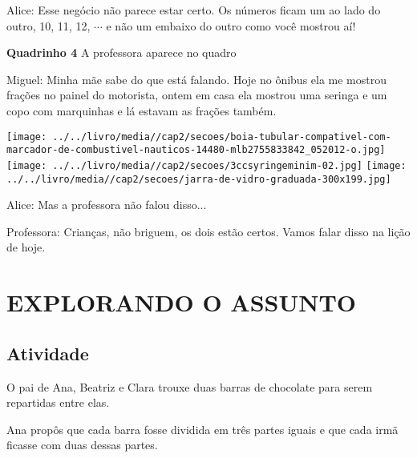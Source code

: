 \documentclass[a4,12pt]{book}
\begin{document}
\begin{imagem*}[breakable]{}{}
  Alice: Esse negócio não parece estar certo. Os números ficam um ao lado do outro, 10, 11, 12,   $\cdots$   e não um embaixo do outro como você mostrou aí!  
  
  {\bf Quadrinho 4}  
  A professora aparece no quadro  
  
  Miguel: Minha mãe sabe do que está falando. Hoje no ônibus ela me mostrou frações no painel do motorista, ontem em casa ela mostrou uma seringa e um copo com marquinhas e lá estavam as frações também.  
  
    \texttt{[image: ../../livro/media//cap2/secoes/boia-tubular-compativel-com-marcador-de-combustivel-nauticos-14480-mlb2755833842\_052012-o.jpg]}   
    \texttt{[image: ../../livro/media//cap2/secoes/3ccsyringeminim-02.jpg]}    
    \texttt{[image: ../../livro/media//cap2/secoes/jarra-de-vidro-graduada-300x199.jpg]}  
  
  
  Alice: Mas a professora não falou disso...  
  
  Professora: Crianças, não briguem, os dois estão certos. Vamos falar disso na lição de hoje.  
  
\end{imagem*}

\section{EXPLORANDO O ASSUNTO }

\subsection{Atividade}

O pai de Ana, Beatriz e Clara trouxe duas barras de chocolate para serem repartidas entre elas.

\begin{center}
\end{center}

Ana propôs que cada barra fosse dividida em três partes iguais e que cada irmã ficasse com duas dessas partes.
\end{document}
